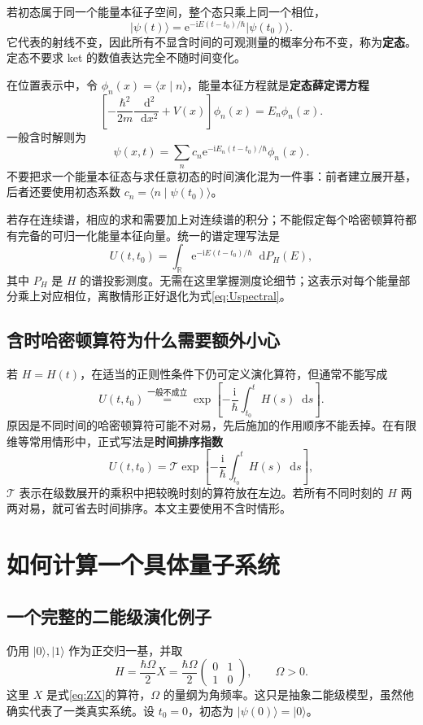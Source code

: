 \documentclass[a4paper,11pt]{article}
\numberwithin{equation}{section}
\newcommand{\ii}{\mathrm{i}}
\newcommand{\dd}{\mathop{}\!\mathrm{d}}
\newcommand{\ee}{\mathrm{e}}
\newcommand{\ket}[1]{\lvert #1\rangle}
\newcommand{\braket}[2]{\langle #1\mid #2\rangle}
\begin{document}
若初态属于同一个能量本征子空间，整个态只乘上同一个相位，
\[
  \ket{\psi(t)}=\ee^{-\ii E(t-t_0)/\hbar}\ket{\psi(t_0)}.
\]
它代表的射线不变，因此所有不显含时间的可观测量的概率分布不变，称为\textbf{定态}。定态不要求 ket 的数值表达完全不随时间变化。

在位置表示中，令 $\phi_n(x)=\braket{x}{n}$，能量本征方程就是\textbf{定态薛定谔方程}
\begin{equation}
  \left[-\frac{\hbar^2}{2m}\frac{\dd^2}{\dd x^2}+V(x)\right]\phi_n(x)
  =E_n\phi_n(x).
\end{equation}
一般含时解则为
\[
  \psi(x,t)=\sum_n c_n\ee^{-\ii E_n(t-t_0)/\hbar}\phi_n(x).
\]
不要把求一个能量本征态与求任意初态的时间演化混为一件事：前者建立展开基，后者还要使用初态系数 $c_n=\braket{n}{\psi(t_0)}$。

若存在连续谱，相应的求和需要加上对连续谱的积分；不能假定每个哈密顿算符都有完备的可归一化能量本征向量。统一的谱定理写法是
\begin{equation}
  U(t,t_0)=\int_{\mathbb R}\ee^{-\ii E(t-t_0)/\hbar}\dd P_H(E),
\end{equation}
其中 $P_H$ 是 $H$ 的谱投影测度。无需在这里掌握测度论细节；这表示对每个能量部分乘上对应相位，离散情形正好退化为式\eqref{eq:Uspectral}。

\subsection{含时哈密顿算符为什么需要额外小心}
若 $H=H(t)$，在适当的正则性条件下仍可定义演化算符，但通常不能写成
\[
  U(t,t_0)\overset{\text{一般不成立}}{=}
  \exp\left[-\frac{\ii}{\hbar}\int_{t_0}^t H(s)\dd s\right].
\]
原因是不同时间的哈密顿算符可能不对易，先后施加的作用顺序不能丢掉。在有限维等常用情形中，正式写法是\textbf{时间排序指数}
\[
  U(t,t_0)=\mathcal T\exp\left[-\frac{\ii}{\hbar}\int_{t_0}^t H(s)\dd s\right],
\]
$\mathcal T$ 表示在级数展开的乘积中把较晚时刻的算符放在左边。若所有不同时刻的 $H$ 两两对易，就可省去时间排序。本文主要使用不含时情形。

\section{如何计算一个具体量子系统}
\subsection{一个完整的二能级演化例子}
仍用 $\ket{0},\ket{1}$ 作为正交归一基，并取
\begin{equation}
  H=\frac{\hbar\Omega}{2}X
  =\frac{\hbar\Omega}{2}
  \begin{pmatrix}0&1\\1&0\end{pmatrix},\qquad \Omega>0.
\end{equation}
这里 $X$ 是式\eqref{eq:ZX}的算符，$\Omega$ 的量纲为角频率。这只是抽象二能级模型，虽然他确实代表了一类真实系统。设 $t_0=0$，初态为 $\ket{\psi(0)}=\ket{0}$。
\end{document}
